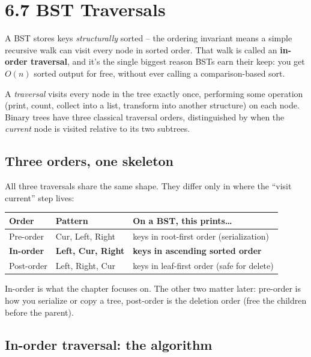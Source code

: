 \documentclass[11pt]{article}
\begin{document}
\section{6.7 BST Traversals}

A BST stores keys \emph{structurally} sorted -- the ordering invariant means a simple recursive walk can visit every node in sorted order. That walk is called an \textbf{in-order traversal}, and it's the single biggest reason BSTs earn their keep: you get $O(n)$ sorted output for free, without ever calling a comparison-based sort.

\begin{defnbox}
A \emph{traversal} visits every node in the tree exactly once, performing some operation (print, count, collect into a list, transform into another structure) on each node. Binary trees have three classical traversal orders, distinguished by when the \emph{current} node is visited relative to its two subtrees.
\end{defnbox}

\subsection*{Three orders, one skeleton}

All three traversals share the same shape. They differ only in where the ``visit current'' step lives:

\begin{center}
\begin{tabular}{lll}
\textbf{Order}   & \textbf{Pattern} & \textbf{On a BST, this prints\dots} \\
\hline
Pre-order        & Cur, Left, Right & keys in root-first order (serialization) \\
\textbf{In-order} & \textbf{Left, Cur, Right} & \textbf{keys in ascending sorted order} \\
Post-order       & Left, Right, Cur & keys in leaf-first order (safe for delete) \\
\end{tabular}
\end{center}

In-order is what the chapter focuses on. The other two matter later: pre-order is how you serialize or copy a tree, post-order is the deletion order (free the children before the parent).

\subsection*{In-order traversal: the algorithm}
\end{document}

